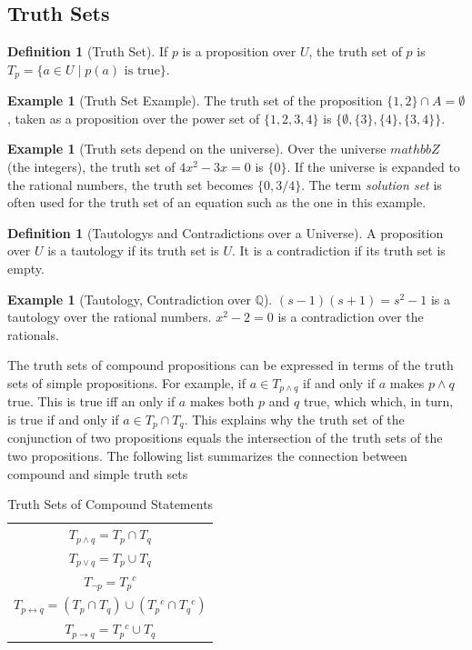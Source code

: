 \documentclass[10pt,]{book}
\theoremstyle{plain}
\theoremstyle{definition}
\newtheorem{definition}[theorem]{Definition}
\theoremstyle{definition}
\theoremstyle{definition}
\newtheorem{example}[theorem]{Example}
\theoremstyle{definition}
\begin{document}
\subsection[Truth Sets]{Truth Sets}\label{ss-truth-sets}
\begin{definition}[Truth Set]\label{def-truth-set}
\label{notation-11}
If \(p\) is a proposition over \(U\), the truth set of \(p\) is \(T_p = \{a \in  U \mid p(a) \textrm{ is true}\}\).%
\end{definition}
\begin{example}[Truth Set Example]\label{ex-set-prop}
The truth set of the proposition \(\{1, 2\} \cap A = \emptyset\), taken as a proposition over the power set of \(\{1, 2, 3, 4\}\) is \(\{\emptyset , \{3\}, \{4\}, \{3, 4\}\}\).
%
\end{example}
\begin{example}[Truth sets depend on the universe]\label{ex-vary-U}
Over the universe \(mathbb{Z}\) (the integers), the truth set of \(4x^2- 3x = 0\) is \(\{0\}\). If the universe is expanded to the rational numbers, the truth set becomes \(\{0, 3/4\}\). The term \emph{solution set} is often used for the truth set of an equation such as the one in this example.%
\end{example}
\begin{definition}[Tautologys and Contradictions over a Universe]\label{def-tautology-contradiction-over-U}
 A proposition over \(U\) is a tautology if its truth set is \(U\). It is a contradiction if its truth set is empty.%
\end{definition}
\begin{example}[Tautology, Contradiction over \(\mathbb{Q}\)]\label{ex-tautology-contradiction-over-U}
 \((s - 1)(s + 1) = s^2 - 1\) is a tautology over the rational numbers. \(x^2-2 = 0\) is a contradiction over the rationals.%
\end{example}
The truth sets of compound propositions can be expressed in terms of the truth sets of simple propositions. For example, if \(a \in  T_{p\land q}\) if and only if \(a\) makes \(p \land  q\) true. This is true iff an only if  \(a\) makes both \(p\) and \(q\) true, which which, in turn, is true if and only if  \(a \in  T_p\cap T_q\). This explains why the truth set of the conjunction of two propositions equals the intersection of the truth sets of the two propositions. The following list summarizes the connection between compound and simple truth sets%
\leavevmode%
\begin{table}
\centering
\begin{tabular}{c}
\(T_{p\land q}=T_p\cap T_q\)\tabularnewline[0pt]
\(T_{p\lor q}=T_p\cup T_q\)\tabularnewline[0pt]
\(T_{\neg p}=T_p{}^c\)\tabularnewline[0pt]
\(T_{p\leftrightarrow q}=\left(T_p\cap T_q\right)\cup \left(T_p{}^c\cap T_q{}^c\right)\)\tabularnewline[0pt]
\(T_{p\to q}=T_p{}^c\cup T_q\)
\end{tabular}
\caption{Truth Sets of Compound Statements\label{table-truth-sets-compound-statements}}
\end{table}
\end{document}
